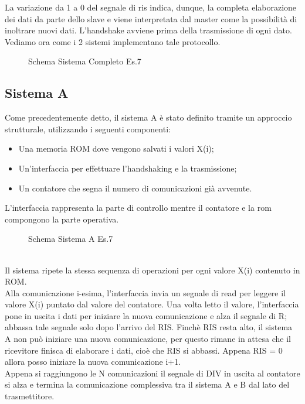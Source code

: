 \documentclass[12pt]{article}
\def \Esette {Allegati/Esercizio7/}
\begin{document}
La variazione da 1 a 0 del segnale di ris indica, dunque, la completa elaborazione dei dati da parte dello slave e viene interpretata dal master come la possibilità di inoltrare nuovi dati.
L’handshake avviene prima della trasmissione di ogni dato.
Vediamo ora come i 2 sistemi implementano tale protocollo.
\begin{figure}[ht!]
    \centering
    
    \caption{Schema Sistema Completo Es.7}
\end{figure}
\clearpage
\subsection{Sistema A}
Come precedentemente detto, il sistema A è stato definito tramite un approccio strutturale, utilizzando i seguenti componenti:
\begin{itemize}
    \item Una memoria ROM dove vengono salvati i valori X(i);
    \item Un'interfaccia per effettuare l'handshaking e la trasmissione;
    \item Un contatore che segna il numero di comunicazioni già avvenute.
\end{itemize}
L’interfaccia rappresenta la parte di controllo mentre il contatore e la rom compongono la parte operativa.
\begin{figure}[ht!]
    \centering
    
    \caption{Schema Sistema A Es.7}
\end{figure}
\\Il sistema ripete la stessa sequenza di operazioni per ogni valore X(i) contenuto in ROM.
\\Alla comunicazione i-esima, l'interfaccia invia un segnale di read per leggere il valore X(i) puntato dal valore del contatore. Una volta letto il valore, l'interfaccia pone in uscita i dati per iniziare la nuova comunicazione e alza il segnale di R; abbassa tale segnale solo dopo l'arrivo del RIS. Finchè RIS resta alto, il sistema A non può iniziare una nuova comunicazione, per questo rimane in attesa che il ricevitore finisca di elaborare i dati, cioè che RIS si abbassi. Appena RIS = 0 allora posso iniziare la nuova comunicazione i+1.
\\Appena si raggiungono le N comunicazioni il segnale di DIV in uscita al contatore si alza e termina la comunicazione complessiva tra il sistema A e B dal lato del trasmettitore.
\clearpage
\end{document}
